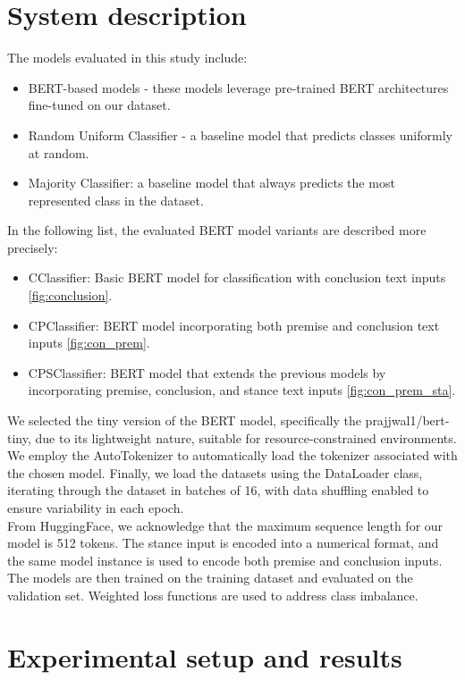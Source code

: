 \documentclass[11pt]{article}
\begin{document}
\section{System description}
\label{sec:system}
The models evaluated in this study include:
\begin{itemize}
    \item BERT-based models - these models leverage pre-trained BERT architectures fine-tuned on our dataset. %
    \item  Random Uniform Classifier - a baseline model that predicts classes uniformly at random.
    \item Majority Classifier: a baseline model that always predicts the most represented class in the dataset.
\end{itemize}
In the following list, the evaluated BERT model variants are described more precisely:
\begin{itemize}[label=$\diamond$]
    \item CClassifier: Basic BERT model for classification with conclusion text inputs \ref{fig:conclusion}.
    \item CPClassifier: BERT model incorporating both premise and conclusion text inputs \ref{fig:con_prem}.        \item CPSClassifier: BERT model that extends the previous models by incorporating premise, conclusion, and stance text inputs \ref{fig:con_prem_sta}.
\end{itemize}
We selected the tiny version of the BERT model, specifically the prajjwal1/bert-tiny, due to its lightweight nature, suitable for resource-constrained environments. We employ the AutoTokenizer to automatically load the tokenizer associated with the chosen model. Finally, we load the datasets using the DataLoader class, iterating through the dataset in batches of 16, with data shuffling enabled to ensure variability in each epoch.
\\From HuggingFace, we acknowledge that the maximum sequence length for our model is 512 tokens. The stance input is encoded into a numerical format, and the same model instance is used to encode both premise and conclusion inputs.
The models are then trained on the training dataset and evaluated on the validation set. Weighted loss functions are used to address class imbalance. 

\section{Experimental setup and results}
\label{sec:results}
\end{document}
